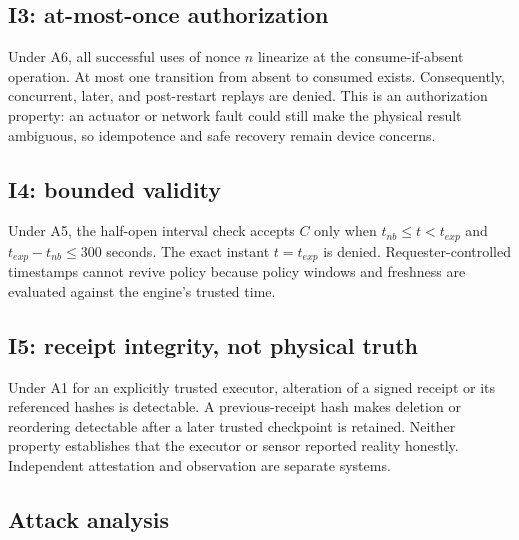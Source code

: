 \documentclass[10.5pt,a4paper]{article}
\begin{document}
\subsection{I3: at-most-once authorization}

Under A6, all successful uses of nonce $n$ linearize at the consume-if-absent operation. At most
one transition from absent to consumed exists. Consequently, concurrent, later, and post-restart
replays are denied. This is an authorization property: an actuator or network fault could still
make the physical result ambiguous, so idempotence and safe recovery remain device concerns.

\subsection{I4: bounded validity}

Under A5, the half-open interval check accepts $C$ only when
$t_{nb}\leq t<t_{exp}$ and $t_{exp}-t_{nb}\leq300$ seconds. The exact instant
$t=t_{exp}$ is denied. Requester-controlled timestamps cannot revive policy because policy
windows and freshness are evaluated against the engine's trusted time.

\subsection{I5: receipt integrity, not physical truth}

Under A1 for an explicitly trusted executor, alteration of a signed receipt or its referenced
hashes is detectable. A previous-receipt hash makes deletion or reordering detectable after a
later trusted checkpoint is retained. Neither property establishes that the executor or sensor
reported reality honestly. Independent attestation and observation are separate systems.

\subsection{Attack analysis}
\end{document}
